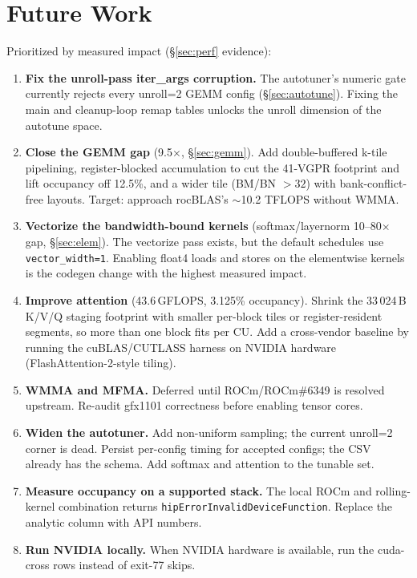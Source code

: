 \documentclass[10pt,twoside]{article}
\begin{document}
\section{Future Work}
\label{sec:future}

Prioritized by measured impact (\S\ref{sec:perf} evidence):
\begin{enumerate}
  \item \textbf{Fix the unroll-pass iter\_args corruption.} The autotuner's numeric gate
        currently rejects every unroll=2 GEMM config (\S\ref{sec:autotune}). Fixing the main
        and cleanup-loop remap tables unlocks the unroll dimension of the autotune space.
  \item \textbf{Close the GEMM gap} (9.5$\times$, \S\ref{sec:gemm}). Add double-buffered
        k-tile pipelining, register-blocked accumulation to cut the 41-VGPR footprint and
        lift occupancy off 12.5\%, and a wider tile (BM/BN $> 32$) with bank-conflict-free
        layouts. Target: approach rocBLAS's $\sim$10.2 TFLOPS without WMMA.
  \item \textbf{Vectorize the bandwidth-bound kernels} (softmax/layernorm 10--80$\times$ gap,
        \S\ref{sec:elem}). The vectorize pass exists, but the default schedules use
        \texttt{vector\_width=1}. Enabling float4 loads and stores on the elementwise kernels
        is the codegen change with the highest measured impact.
  \item \textbf{Improve attention} (43.6\,GFLOPS, 3.125\% occupancy). Shrink the 33\,024\,B
        K/V/Q staging footprint with smaller per-block tiles or register-resident segments, so
        more than one block fits per CU. Add a cross-vendor baseline by running the
        cuBLAS/CUTLASS harness on NVIDIA hardware (FlashAttention-2-style \cite{flashattn2}
        tiling).
  \item \textbf{WMMA and MFMA.} Deferred until ROCm/ROCm\#6349 \cite{rocm_github} is resolved
        upstream. Re-audit gfx1101 correctness before enabling tensor cores.
  \item \textbf{Widen the autotuner.} Add non-uniform sampling; the current unroll=2 corner is
        dead. Persist per-config timing for accepted configs; the CSV already has the schema.
        Add softmax and attention to the tunable set.
  \item \textbf{Measure occupancy on a supported stack.} The local ROCm and rolling-kernel
        combination returns \texttt{hipErrorInvalidDeviceFunction}. Replace the analytic
        column with API numbers.
  \item \textbf{Run NVIDIA locally.} When NVIDIA hardware is available, run the cuda-cross
        rows instead of exit-77 skips.
\end{enumerate}
\end{document}

